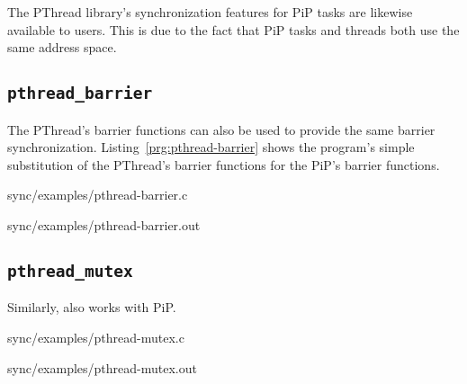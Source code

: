 The PThread library's synchronization features for PiP tasks are
likewise available to users. This is due to the fact that PiP tasks
and threads both use the same address space. 

\subsection{\tt pthread_barrier}

The PThread's barrier functions can also be used to provide the same
barrier synchronization. Listing~\ref{prg:pthread-barrier} shows the
program's simple substitution of the PThread's barrier functions for the
PiP's barrier functions.


                {sync/examples/pthread-barrier.c}


                {sync/examples/pthread-barrier.out}
                
\subsection{\tt pthread_mutex}

Similarly,  also works with PiP. 


                {sync/examples/pthread-mutex.c}


                {sync/examples/pthread-mutex.out}
